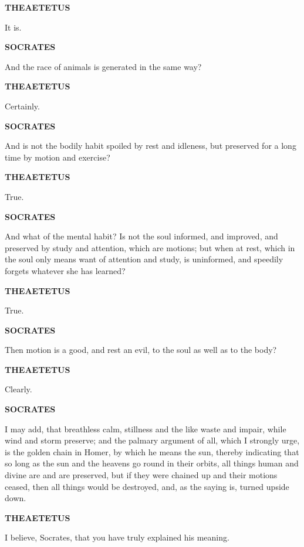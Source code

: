 \documentclass[11pt,letter]{article}
\begin{document}
\par \textbf{THEAETETUS}
\par   It is.

\par \textbf{SOCRATES}
\par   And the race of animals is generated in the same way?

\par \textbf{THEAETETUS}
\par   Certainly.

\par \textbf{SOCRATES}
\par   And is not the bodily habit spoiled by rest and idleness, but preserved for a long time by motion and exercise?

\par \textbf{THEAETETUS}
\par   True.

\par \textbf{SOCRATES}
\par   And what of the mental habit? Is not the soul informed, and improved, and preserved by study and attention, which are motions; but when at rest, which in the soul only means want of attention and study, is uninformed, and speedily forgets whatever she has learned?

\par \textbf{THEAETETUS}
\par   True.

\par \textbf{SOCRATES}
\par   Then motion is a good, and rest an evil, to the soul as well as to the body?

\par \textbf{THEAETETUS}
\par   Clearly.

\par \textbf{SOCRATES}
\par   I may add, that breathless calm, stillness and the like waste and impair, while wind and storm preserve; and the palmary argument of all, which I strongly urge, is the golden chain in Homer, by which he means the sun, thereby indicating that so long as the sun and the heavens go round in their orbits, all things human and divine are and are preserved, but if they were chained up and their motions ceased, then all things would be destroyed, and, as the saying is, turned upside down.

\par \textbf{THEAETETUS}
\par   I believe, Socrates, that you have truly explained his meaning.
\end{document}
